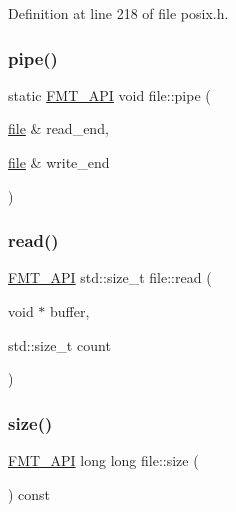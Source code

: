 Definition at line 218 of file posix.\+h.

\mbox{\label{classfile_a096b53bfb1b4cd1b566ddea0d6a6f3bc}} 
\subsubsection{\texorpdfstring{pipe()}{pipe()}}
{\footnotesize\ttfamily static \hyperlink{core_8h_a9a4960b70582ed2620911a0b75dce0b5}{F\+M\+T\+\_\+\+A\+PI} void file\+::pipe (\begin{DoxyParamCaption}\item[{\hyperlink{classfile}{file} \&}]{read\+\_\+end,  }\item[{\hyperlink{classfile}{file} \&}]{write\+\_\+end }\end{DoxyParamCaption})\hspace{0.3cm}{\ttfamily [static]}}

\mbox{\label{classfile_a0bd904f0a22919c36cefef0098c869e5}} 
\subsubsection{\texorpdfstring{read()}{read()}}
{\footnotesize\ttfamily \hyperlink{core_8h_a9a4960b70582ed2620911a0b75dce0b5}{F\+M\+T\+\_\+\+A\+PI} std\+::size\+\_\+t file\+::read (\begin{DoxyParamCaption}\item[{void $\ast$}]{buffer,  }\item[{std\+::size\+\_\+t}]{count }\end{DoxyParamCaption})}

\mbox{\label{classfile_a6ddfe0a8c58656f1dcdfd90869307bf1}} 
\subsubsection{\texorpdfstring{size()}{size()}}
{\footnotesize\ttfamily \hyperlink{core_8h_a9a4960b70582ed2620911a0b75dce0b5}{F\+M\+T\+\_\+\+A\+PI} long long file\+::size (\begin{DoxyParamCaption}{ }\end{DoxyParamCaption}) const}

\mbox{\label{classfile_a3b9de9cd17abc79f4cd8b7fd48fcd9ec}} 
